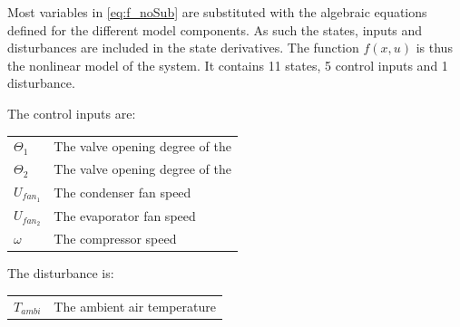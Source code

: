 Most variables in \cref{eq:f_noSub} are substituted with the algebraic equations defined for the different model components. As such the states, inputs and disturbances are included in the state derivatives. The function $f(x,u)$ is thus the nonlinear model of the system. It contains 11 states, 5 control inputs and 1 disturbance.

The control inputs are:

\begin{center}
	\begin{tabular}{l p{10cm}}
		$ \Theta_1 $  & The valve opening degree of the \\
		$ \Theta_2 $  & The valve opening degree of the \\
		$ U_{fan_1} $ & The condenser fan speed         \\
		$ U_{fan_2} $ & The evaporator fan speed        \\
		$ \omega $    & The compressor speed
	\end{tabular}
\end{center}

The disturbance is:

\begin{center}
	\begin{tabular}{l p{10cm}}
		$ T_{ambi} $  & The ambient air temperature
	\end{tabular}
\end{center}